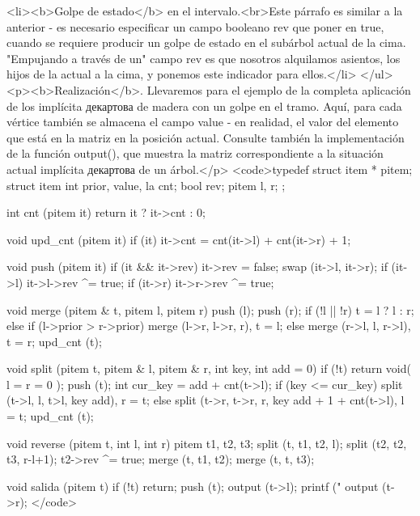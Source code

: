 <li><b>Golpe de estado</b> en el intervalo.<br>Este párrafo es similar a la anterior - es necesario especificar un campo booleano rev que poner en true, cuando se requiere producir un golpe de estado en el subárbol actual de la cima. "Empujando a través de un" campo rev es que nosotros alquilamos asientos, los hijos de la actual a la cima, y ponemos este indicador para ellos.</li>
</ul>
<p><b>Realización</b>. Llevaremos para el ejemplo de la completa aplicación de los implícita декартова de madera con un golpe en el tramo. Aquí, para cada vértice también se almacena el campo value - en realidad, el valor del elemento que está en la matriz en la posición actual. Consulte también la implementación de la función output(), que muestra la matriz correspondiente a la situación actual implícita декартова de un árbol.</p>
<code>typedef struct item * pitem;
struct item {
int prior, value, la cnt;
bool rev;
pitem l, r;
};

int cnt (pitem it) {
return it ? it->cnt : 0;
}

void upd_cnt (pitem it) {
if (it)
it->cnt = cnt(it->l) + cnt(it->r) + 1;
}

void push (pitem it) {
if (it && it->rev) {
it->rev = false;
swap (it->l, it->r);
if (it->l) it->l->rev ^= true;
if (it->r) it->r->rev ^= true;
}
}

void merge (pitem & t, pitem l, pitem r) {
push (l);
push (r);
if (!l || !r)
t = l ? l : r;
else if (l->prior > r->prior)
merge (l->r, l->r, r), t = l;
else
merge (r->l, l, r->l), t = r;
upd_cnt (t);
}

void split (pitem t, pitem & l, pitem & r, int key, int add = 0) {
if (!t)
return void( l = r = 0 );
push (t);
int cur_key = add + cnt(t->l);
if (key <= cur_key)
split (t->l, l, t>l, key add), r = t;
else
split (t->r, t->r, r, key add + 1 + cnt(t->l), l = t;
upd_cnt (t);
}

void reverse (pitem t, int l, int r) {
pitem t1, t2, t3;
split (t, t1, t2, l);
split (t2, t2, t3, r-l+1);
t2->rev ^= true;
merge (t, t1, t2);
merge (t, t, t3);
}

void salida (pitem t) {
if (!t) return;
push (t);
output (t->l);
printf ("%
output (t->r);
}</code>